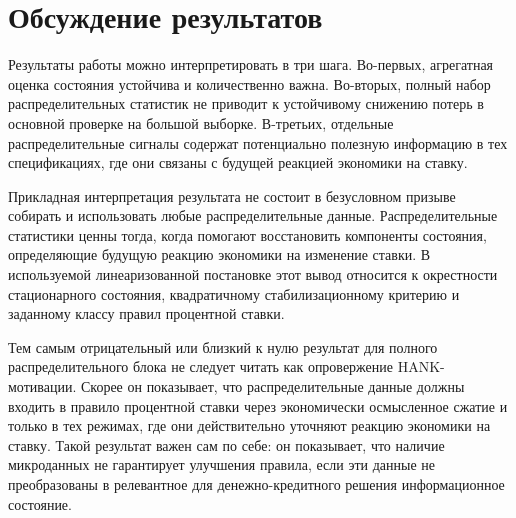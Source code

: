 \section{Обсуждение результатов}

Результаты работы можно интерпретировать в три шага. Во-первых, агрегатная оценка состояния
устойчива и количественно важна. Во-вторых, полный набор распределительных статистик не приводит
к устойчивому снижению потерь в основной проверке на большой выборке. В-третьих, отдельные распределительные сигналы
содержат потенциально полезную информацию в тех спецификациях, где они связаны с будущей реакцией
экономики на ставку.

Прикладная интерпретация результата не состоит в безусловном призыве собирать и использовать
любые распределительные данные. Распределительные статистики ценны тогда, когда помогают
восстановить компоненты состояния, определяющие будущую реакцию экономики на изменение ставки.
В используемой линеаризованной постановке этот вывод относится к окрестности стационарного
состояния, квадратичному стабилизационному критерию и заданному классу правил процентной ставки.

Тем самым отрицательный или близкий к нулю результат для полного распределительного блока не
следует читать как опровержение HANK-мотивации. Скорее он показывает, что распределительные
данные должны входить в правило процентной ставки через экономически осмысленное сжатие и только в тех
режимах, где они действительно уточняют реакцию экономики на ставку.
Такой результат важен сам по себе: он показывает, что наличие микроданных не гарантирует улучшения
правила, если эти данные не преобразованы в релевантное для денежно-кредитного решения
информационное состояние.
